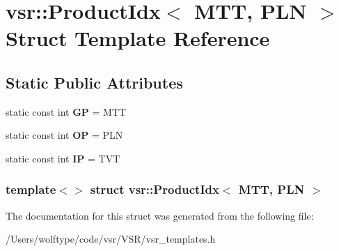 \hypertarget{structvsr_1_1_product_idx_3_01_m_t_t_00_01_p_l_n_01_4}{\section{vsr\-:\-:Product\-Idx$<$ M\-T\-T, P\-L\-N $>$ Struct Template Reference}
\label{structvsr_1_1_product_idx_3_01_m_t_t_00_01_p_l_n_01_4}
}
\subsection*{Static Public Attributes}
\begin{DoxyCompactItemize}
\item 
\hypertarget{structvsr_1_1_product_idx_3_01_m_t_t_00_01_p_l_n_01_4_ac6927b153b046cfb2b7eec06aeb7f97e}{static const int {\bfseries G\-P} = M\-T\-T}\label{structvsr_1_1_product_idx_3_01_m_t_t_00_01_p_l_n_01_4_ac6927b153b046cfb2b7eec06aeb7f97e}

\item 
\hypertarget{structvsr_1_1_product_idx_3_01_m_t_t_00_01_p_l_n_01_4_a9d7ab7a4be7cedb89819a5c820ccf37e}{static const int {\bfseries O\-P} = P\-L\-N}\label{structvsr_1_1_product_idx_3_01_m_t_t_00_01_p_l_n_01_4_a9d7ab7a4be7cedb89819a5c820ccf37e}

\item 
\hypertarget{structvsr_1_1_product_idx_3_01_m_t_t_00_01_p_l_n_01_4_a4833789b22a7e7789db9e2489cdf38f1}{static const int {\bfseries I\-P} = T\-V\-T}\label{structvsr_1_1_product_idx_3_01_m_t_t_00_01_p_l_n_01_4_a4833789b22a7e7789db9e2489cdf38f1}

\end{DoxyCompactItemize}
\subsubsection*{template$<$$>$ struct vsr\-::\-Product\-Idx$<$ M\-T\-T, P\-L\-N $>$}



The documentation for this struct was generated from the following file\-:\begin{DoxyCompactItemize}
\item 
/\-Users/wolftype/code/vsr/\-V\-S\-R/vsr\-\_\-templates.\-h\end{DoxyCompactItemize}

